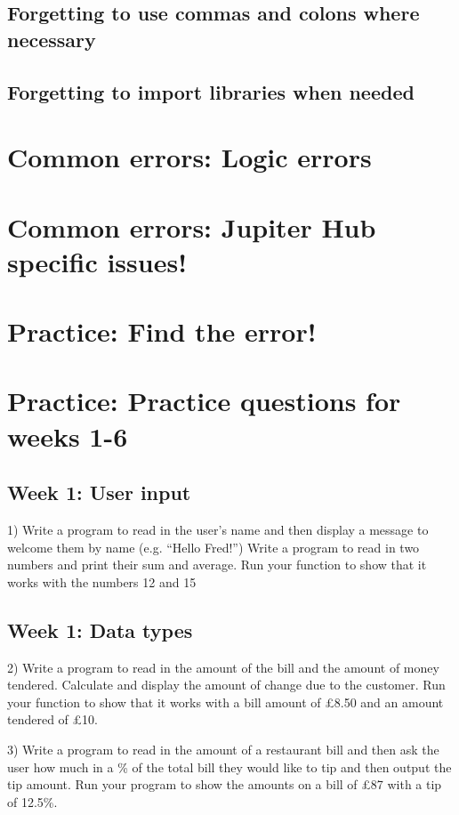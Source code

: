 \documentclass{article}
\begin{document}
	\subsection{Forgetting to use commas and colons where necessary}
	
	
	\subsection{Forgetting to import libraries when needed}
	
	\section{Common errors: Logic errors}
	\section{Common errors: Jupiter Hub specific issues!}
	\section{Practice: Find the error!}
	
	
	\section{Practice: Practice questions for weeks 1-6}
	
	\subsection{Week 1: User input}
	1) Write a program to read in the user’s name and then display a message to welcome them by name (e.g.  “Hello Fred!”) 
	Write a program to read in two numbers and print their sum and average. Run your function to show that it works with the numbers 12 and 15
	 \subsection{Week 1: Data types}
	 2) Write a program to read in the amount of the bill and the amount of money tendered. Calculate and display the amount of change due to the customer. Run your function to show that it works with a bill amount of £8.50 and an amount tendered of £10.
	 
	 3) Write a program to read in the amount of a restaurant bill and then ask the user how much in a \% of the total bill they would like to tip and then output the tip amount. Run your program to show the amounts on a bill of £87 with a tip of 12.5\%.
\end{document}
